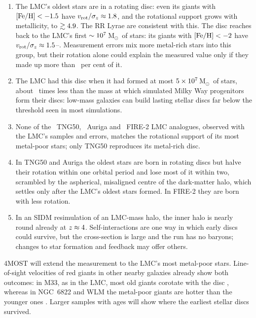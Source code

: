\documentclass[fleqn,usenatbib,letters]{mnras}
\newcommand{\feh}{[{\rm Fe/H}]}
\newcommand{\Msun}{\,M$_\odot$}
\begin{document}
\begin{enumerate}
\item The LMC's oldest stars are in a rotating disc: even its giants
  with $\feh<\ltFehA$ have $v_{\rm rot}/\sigma_z\approx1.8$,
  and the rotational support grows with metallicity, to
  $\gtrsim4.9$. The RR Lyrae are consistent with this.
  The disc reaches back to the LMC's first $\sim10^{7}$\Msun\ of
  stars: its giants with $\feh<\ltLowFeh$ have
  $v_{\rm rot}/\sigma_z\approx1.5$--\ltLowRatioHi. Measurement
  errors mix more metal-rich stars into this group, but their rotation
  alone could explain the measured value only if they made up more than
  \ltLowInterMax\ per cent of it.
\item The LMC had this disc when it had formed at most
  $5\times10^{7}$\Msun\ of stars, about \ltEarlyRatio\ times less than
  the mass at which simulated Milky Way progenitors form their discs:
  low-mass galaxies can build lasting stellar discs far below the
  threshold seen in most simulations.
\item None of the \ltNTng\ TNG50, \ltNAu\ Auriga and \ltNFire\ FIRE-2
  LMC analogues, observed with the LMC's samples and errors, matches
  the rotational support of its most metal-poor stars; only TNG50
  reproduces its metal-rich disc.
\item In TNG50 and Auriga the oldest stars are born in rotating discs
  but halve their rotation within one orbital period and lose most of
  it within two, scrambled by the aspherical, misaligned centre of the
  dark-matter halo, which settles only after the LMC's oldest stars
  formed. In FIRE-2 they are born with less rotation.
\item In an SIDM resimulation of an LMC-mass halo, the inner halo is
  nearly round already at $z\approx4$. Self-interactions are
  one way in which early discs could survive, but the cross-section is
  large and the run has no baryons; changes to star formation and
  feedback may offer others.
\end{enumerate}

4MOST \citep{Cioni2019} will extend the measurement to the LMC's most
metal-poor stars. Line-of-sight velocities of red giants in other
nearby galaxies already show both outcomes: in M33, as in the LMC,
most old giants corotate with the disc
\citep{Gilbert2022,Cullinane2023}, whereas in NGC~6822 and WLM the
metal-poor giants are hotter than the younger ones
\citep{Leaman2009,Swan2016}. Larger samples with ages will show where
the earliest stellar discs survived.
\end{document}
